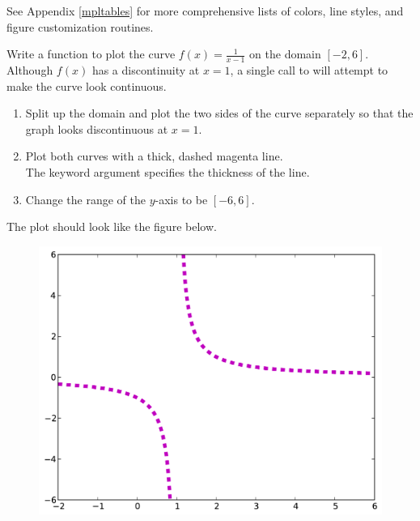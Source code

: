 See Appendix \ref{mpltables} for more comprehensive lists of colors, line styles, and figure customization routines.
    
\begin{problem} %
\label{prob:lineplot}
Write a function to plot the curve $f(x) = \frac{1}{x-1}$ on the domain $[-2,6]$.
Although $f(x)$ has a discontinuity at $x=1$, a single call to  will attempt to make the curve look continuous.
\begin{enumerate}
\item Split up the domain and plot the two sides of the curve separately so that the graph looks discontinuous at $x=1$.
\item Plot both curves with a thick, dashed magenta line.\\
The keyword argument  specifies the thickness of the line.
\item Change the range of the $y$-axis to be $[-6, 6]$.
\end{enumerate}
The plot should look like the figure below.

\begin{figure}[H]
\includegraphics[width=.7\textwidth]{soln2.pdf}
\end{figure}
\end{problem}

